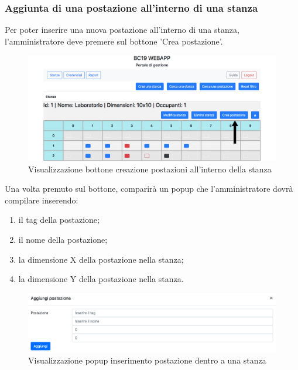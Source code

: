 \subsubsection{Aggiunta di una postazione all'interno di una stanza}
Per poter inserire una nuova postazione all'interno di una stanza, l'amministratore deve premere sul bottone 'Crea postazione'.
\begin{figure}[H]
	\centering
	\includegraphics[width=15cm]{res/images/bottoneAddWorkstation.png}
	\caption{Visualizzazione bottone creazione postazioni all'interno della stanza}
\end{figure}
Una volta premuto sul bottone, comparirà un popup che l'amministratore dovrà compilare inserendo:
\begin{enumerate}
	\item il tag della postazione;
	\item il nome della postazione;
	\item la dimensione X della postazione nella stanza;
	\item la dimensione Y della postazione nella stanza.
\end{enumerate}
\begin{figure}[H]
	\centering
	\includegraphics[width=15cm]{res/images/addWorkstation.png}
	\caption{Visualizzazione popup inserimento postazione dentro a una stanza}
\end{figure}

